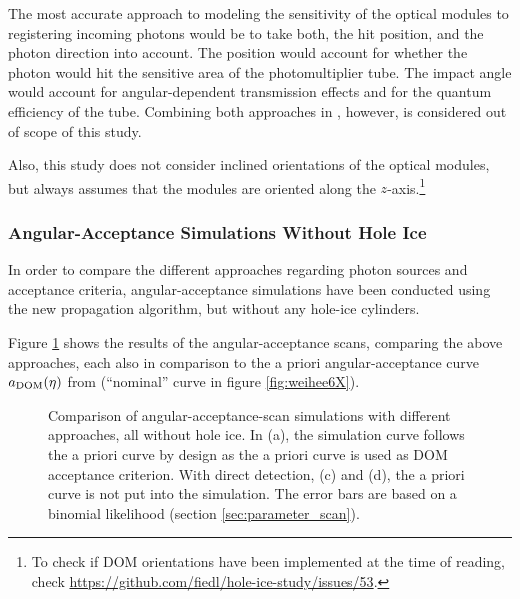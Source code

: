 
The most accurate approach to modeling the sensitivity of the optical
modules to registering incoming photons would be to take both, the hit
position, and the photon direction into account. The position would
account for whether the photon would hit the sensitive area of the
photomultiplier tube. The impact angle would account for
angular-dependent transmission effects and for the quantum efficiency of
the tube. Combining both approaches in \clsim, however, is considered
out of scope of this study.\followup

Also, this study does not consider inclined orientations of the optical
modules, but always assumes that the modules are oriented along the
\(z\)-axis.\footnote{To check if DOM orientations have been implemented at the time of reading, check \url{https://github.com/fiedl/hole-ice-study/issues/53}.}

\subsubsection{Angular-Acceptance Simulations Without Hole Ice}
\label{sec:angular_acceptance_simulations_without_hole_ice}

In order to compare the different approaches regarding photon sources
and acceptance criteria, angular-acceptance simulations have been
conducted using the new propagation algorithm, but without any hole-ice
cylinders.


Figure \ref{fig:Shai8yah} shows the results of the angular-acceptance
scans, comparing the above approaches, each also in comparison to the a
priori angular-acceptance curve \(a_\text{DOM}(\eta)\) from \cite{icepaper}
(``nominal'' curve in figure \ref{fig:weihee6X}).

\begin{figure}[htbp]
  \hfill
  \hfill
  \hfill
  \caption{Comparison of angular-acceptance-scan simulations with different approaches, all without hole ice. In (a), the simulation curve follows the a priori curve by design as the a priori curve is used as DOM acceptance criterion. With direct detection, (c) and (d), the a priori curve is not put into the simulation. The error bars are based on a binomial likelihood (section \ref{sec:parameter_scan}).}
  \label{fig:Shai8yah}
\end{figure}

